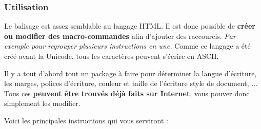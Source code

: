 \subsubsection{Utilisation}

Le balisage est assez semblable au langage HTML. Il est donc possible de \textbf{créer ou modifier des macro-commandes}
afin d'ajouter des raccourcis. \textit{Par exemple pour regrouper plusieurs instructions en une.}
Comme ce langage a été créé avant la Unicode, tous les caractères peuvent s'écrire en ASCII.

Il y a tout d'abord tout un package à faire pour déterminer la langue d’écriture, les marges, polices d’écriture, couleur
et taille de l’écriture style de document, ...
Tous ces \textbf{peuvent être trouvés déjà faits sur Internet}, vous pouvez donc simplement les modifier.


Voici les principales instructions qui vous serviront :

